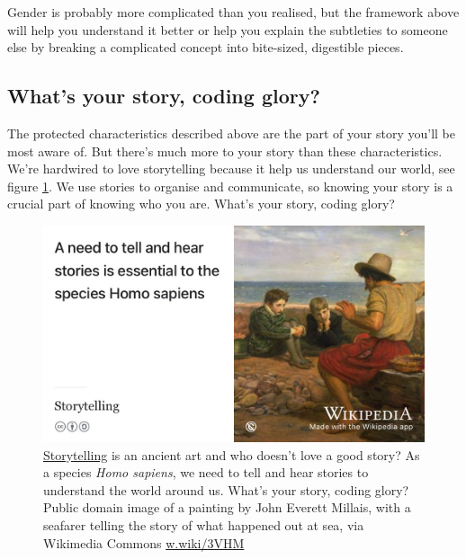 \documentclass[
]{book}
\begin{document}
Gender is probably more complicated than you realised, but the framework above will help you understand it better or help you explain the subtleties to someone else by breaking a complicated concept into bite-sized, digestible pieces.

\hypertarget{story}{%
\subsection{What's your story, coding glory?}\label{story}}

The protected characteristics described above are the part of your story you'll be most aware of. But there's much more to your story than these characteristics. We're hardwired to love storytelling because it help us understand our world, see figure \ref{fig:storytelling-fig}. We use stories to organise and communicate, so knowing your story is a crucial part of knowing who you are. What's your story, coding glory? \citep{whatsthestory}

\begin{figure}

{\centering \includegraphics[width=1\linewidth]{images/storytelling} 

}

\caption{\href{https://en.wikipedia.org/wiki/Storytelling}{Storytelling} is an ancient art and who doesn't love a good story? As a species \emph{Homo sapiens}, we need to tell and hear stories to understand the world around us. What's your story, coding glory? Public domain image of a painting by John Everett Millais, with a seafarer telling the story of what happened out at sea, via Wikimedia Commons \href{https://w.wiki/3VHM}{w.wiki/3VHM}}\label{fig:storytelling-fig}
\end{figure}
\end{document}
